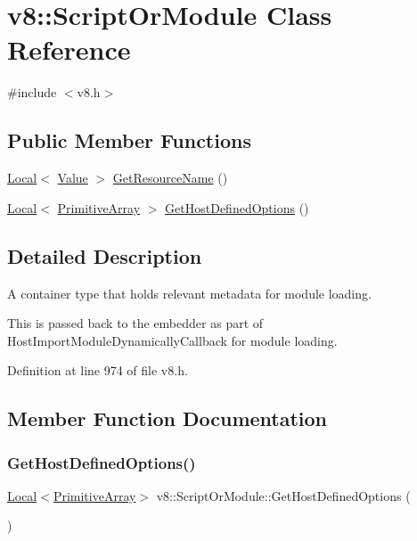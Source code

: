 \hypertarget{classv8_1_1ScriptOrModule}{}\section{v8\+:\+:Script\+Or\+Module Class Reference}
\label{classv8_1_1ScriptOrModule}


{\ttfamily \#include $<$v8.\+h$>$}

\subsection*{Public Member Functions}
\begin{DoxyCompactItemize}
\item 
\mbox{\hyperlink{classv8_1_1Local}{Local}}$<$ \mbox{\hyperlink{classv8_1_1Value}{Value}} $>$ \mbox{\hyperlink{classv8_1_1ScriptOrModule_a6e35d9dc6e0c22ed4d8c1de071b3b9d9}{Get\+Resource\+Name}} ()
\item 
\mbox{\hyperlink{classv8_1_1Local}{Local}}$<$ \mbox{\hyperlink{classv8_1_1PrimitiveArray}{Primitive\+Array}} $>$ \mbox{\hyperlink{classv8_1_1ScriptOrModule_a955fc0a8db835119363af6df91e2e08d}{Get\+Host\+Defined\+Options}} ()
\end{DoxyCompactItemize}


\subsection{Detailed Description}
A container type that holds relevant metadata for module loading.

This is passed back to the embedder as part of Host\+Import\+Module\+Dynamically\+Callback for module loading. 

Definition at line 974 of file v8.\+h.



\subsection{Member Function Documentation}
\mbox{\label{classv8_1_1ScriptOrModule_a955fc0a8db835119363af6df91e2e08d}} 
\subsubsection{\texorpdfstring{Get\+Host\+Defined\+Options()}{GetHostDefinedOptions()}}
{\footnotesize\ttfamily \mbox{\hyperlink{classv8_1_1Local}{Local}}$<$\mbox{\hyperlink{classv8_1_1PrimitiveArray}{Primitive\+Array}}$>$ v8\+::\+Script\+Or\+Module\+::\+Get\+Host\+Defined\+Options (\begin{DoxyParamCaption}{ }\end{DoxyParamCaption})}

